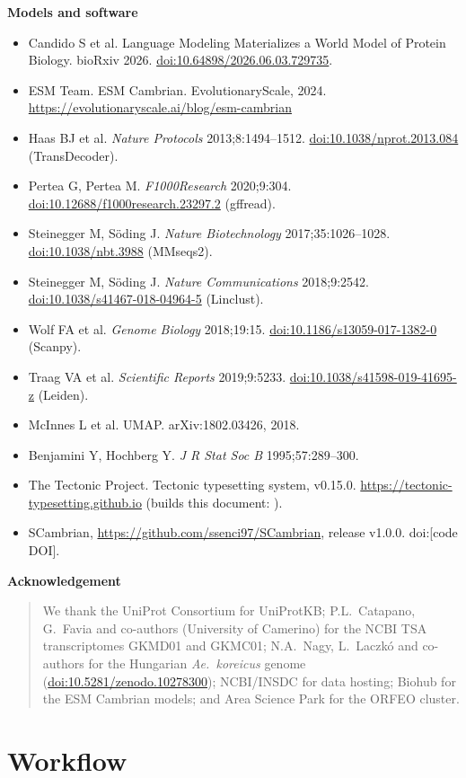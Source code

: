 \documentclass[11pt,a4paper]{article}
\makeatletter
\newcommand{\tbd}[1]{\textcolor{BrickRed}{[#1]}}
\newcommand{\doi}[1]{\href{https://doi.org/#1}{doi:#1}}
\newcommand{\lbl}[1]{\par\if@nobreak\else\needspace{6\baselineskip}\fi\textbf{#1}\par\nopagebreak\@nobreaktrue}
\makeatother
\begin{document}
\lbl{Models and software}
\begin{itemize}
\item Candido S et al. Language Modeling Materializes a World Model of Protein Biology. bioRxiv 2026. \doi{10.64898/2026.06.03.729735}.
\item ESM Team. ESM Cambrian. EvolutionaryScale, 2024. \url{https://evolutionaryscale.ai/blog/esm-cambrian}
\item Haas BJ et al. \emph{Nature Protocols} 2013;8:1494--1512. \doi{10.1038/nprot.2013.084} (TransDecoder).
\item Pertea G, Pertea M. \emph{F1000Research} 2020;9:304. \doi{10.12688/f1000research.23297.2} (gffread).
\item Steinegger M, S\"oding J. \emph{Nature Biotechnology} 2017;35:1026--1028. \doi{10.1038/nbt.3988} (MMseqs2).
\item Steinegger M, S\"oding J. \emph{Nature Communications} 2018;9:2542. \doi{10.1038/s41467-018-04964-5} (Linclust).
\item Wolf FA et al. \emph{Genome Biology} 2018;19:15. \doi{10.1186/s13059-017-1382-0} (Scanpy).
\item Traag VA et al. \emph{Scientific Reports} 2019;9:5233. \doi{10.1038/s41598-019-41695-z} (Leiden).
\item McInnes L et al. UMAP. arXiv:1802.03426, 2018.
\item Benjamini Y, Hochberg Y. \emph{J R Stat Soc B} 1995;57:289--300.
\item The Tectonic Project. Tectonic typesetting system, v0.15.0. \url{https://tectonic-typesetting.github.io} (builds this document: ).
\item SCambrian, \url{https://github.com/ssenci97/SCambrian}, release v1.0.0. doi:\tbd{code DOI}.
\end{itemize}

\lbl{Acknowledgement}
\begin{quote}
We thank the UniProt Consortium for UniProtKB; P.L.~Catapano, G.~Favia and co-authors (University of Camerino) for the NCBI TSA transcriptomes GKMD01 and GKMC01; N.A.~Nagy, L.~Laczk\'o and co-authors for the Hungarian \emph{Ae.\ koreicus} genome (\doi{10.5281/zenodo.10278300}); NCBI/INSDC for data hosting; Biohub for the ESM Cambrian models; and Area Science Park for the ORFEO cluster.
\end{quote}

\section{Workflow}
\end{document}
